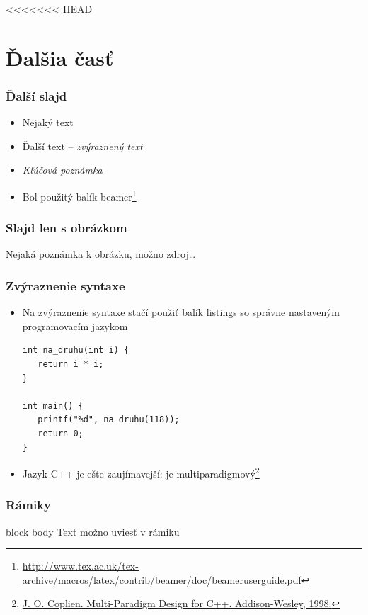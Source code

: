 \documentclass{beamer}
\newcommand{\footcite}[1]{\footnote{\tiny #1}}
\newcommand{\emp}[1]{\textit{\alert{#1}}}
\newenvironment{poznamka}{\begin{beamercolorbox}[rounded=true,shadow=false]{block body}}{\end{beamercolorbox}}
\newcommand{\footcite}[1]{\footnote{\tiny #1}}
\begin{document}
\begin{frame}[fragile=singleslide]
<<<<<<< HEAD
\section{Ďalšia časť}

\begin{frame}[fragile=singleslide]\frametitle{Ďalší slajd}
\begin{itemize}
\item Nejaký text
\item Ďalší text -- \emph{zvýraznený text}
\item \emp{Kľúčová poznámka} %

\item Bol použitý balík beamer\footcite{\url{http://www.tex.ac.uk/tex-archive/macros/latex/contrib/beamer/doc/beameruserguide.pdf}}
\end{itemize}
\end{frame}


\begin{frame}[fragile=singleslide]\frametitle{Slajd len s obrázkom}

{\tiny Nejaká poznámka k obrázku, možno zdroj\ldots}
\end{frame}


\begin{frame}[fragile=singleslide]\frametitle{Zvýraznenie syntaxe}
\begin{itemize}
\item Na zvýraznenie syntaxe stačí použiť balík listings so správne nastaveným programovacím jazykom
\begin{lstlisting}
int na_druhu(int i) {
   return i * i;
}

int main() {
   printf("%d", na_druhu(118));
   return 0;
}
\end{lstlisting}

\item Jazyk C++ je ešte zaujímavejší: je multiparadigmový\footcite{\url{J. O. Coplien. Multi-Paradigm Design for C++. Addison-Wesley, 1998.}}
\end{itemize}
\end{frame}


\begin{frame}[fragile=singleslide]\frametitle{Rámiky}
\begin{poznamka}
Text možno uviesť v rámiku
\end{poznamka}


\end{frame}
\end{frame}
\end{document}
